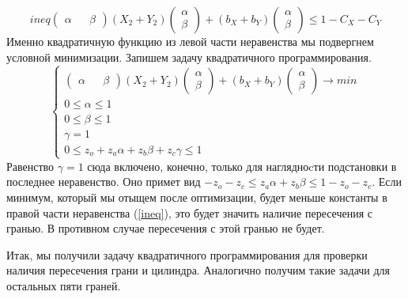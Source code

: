 \documentclass[pdftex,ptm,12pt,a4paper]{report}
\begin{document}
      \begin{equation}{ineq}
            \begin{pmatrix} \alpha && \beta \end{pmatrix}
               (X_2 + Y_2)
             \begin{pmatrix} \alpha \\ \beta \end{pmatrix} +
             (b_X + b_Y) \begin{pmatrix} \alpha \\ \beta \end{pmatrix}  \le
             1 - C_X -C_Y        
      \end{equation}
      Именно квадратичную функцию из левой части неравенства мы подвергнем условной минимизации.
      Запишем задачу квадратичного программирования.
      \begin{equation}\label{quadrtask}
          \begin{cases}
          \begin{pmatrix} \alpha && \beta \end{pmatrix}
               (X_2 + Y_2)
             \begin{pmatrix} \alpha \\ \beta \end{pmatrix} +
             (b_X + b_Y) \begin{pmatrix} \alpha \\ \beta \end{pmatrix} \to min \\
              0 \le  \alpha   \le  1 \\
              0 \le  \beta   \le  1 \\
              \gamma   =  1 \\
              0 \le  z_o + z_a \alpha + z_b \beta + z_c\gamma   \le  1 
          \end{cases}
      \end{equation}
      Равенство $\gamma = 1$ сюда включено, конечно, только для наглядноcти подстановки в последнее неравенство.
      Оно примет вид $ -z_o - z_c \le  z_a \alpha + z_b \beta \le  1 -z_o - z_c$.
      Если минимум, который мы отыщем после оптимизации, будет меньше константы в правой части неравенства (\ref{ineq}), это будет значить наличие пересечения с гранью. 
      В противном случае пересечения с этой гранью не будет.

      Итак, мы получили задачу квадратичного программирования для проверки наличия пересечения грани и цилиндра. 
      Аналогично получим такие задачи для остальных пяти граней.
\end{document}
